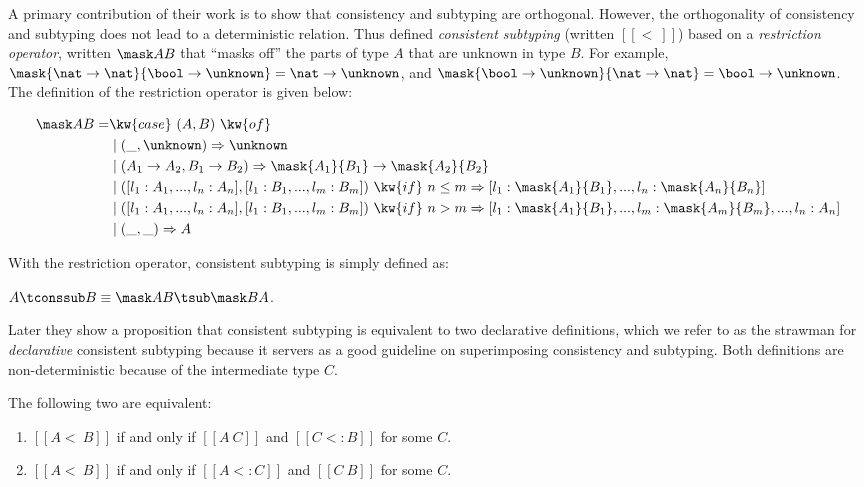 A primary contribution of their work is to show that consistency and subtyping
are orthogonal. However, the orthogonality of consistency and subtyping does not
lead to a deterministic relation.
Thus \citeauthor{siek2007gradual} defined \emph{consistent subtyping} (written
$[[<~]]$) based on a \emph{restriction operator}, written $\mask A B$ that
``masks off'' the parts of type $A$ that are unknown in type $B$. For example,
$\mask {\nat \to \nat} {\bool \to \unknown} = \nat \to \unknown$, and $\mask
{\bool \to \unknown} {\nat \to \nat} = {\bool \to \unknown}$. The definition of
the restriction operator is given below:

\begin{small}
\begin{align*}
   \mask A B = & \kw{case}~(A, B)~\kw{of}  \\
               & \mid (\_, \unknown) \Rightarrow \unknown \\
               & \mid (A_1 \to A_2, B_1 \to B_2)  \Rightarrow  \mask {A_1} {B_1} \to \mask {A_2} {B_2} \\
               & \mid ([l_1: A_1,...,l_n:A_n], [l_1:B_1,...,l_m:B_m])~\kw{if}~n \leq m \Rightarrow
                [l_1 : \mask {A_1} {B_1}, ..., l_n : \mask {A_n} {B_n}]\\
               & \mid ([l_1: A_1,...,l_n:A_n], [l_1:B_1,...,l_m:B_m])~\kw{if}~n > m \Rightarrow  [l_1 : \mask {A_1} {B_1}, ..., l_m : \mask {A_m} {B_m},...,l_n:A_n ]\\
               & \mid (\_, \_) \Rightarrow A
\end{align*}
\end{small}

With the restriction operator, consistent subtyping is simply defined as:

\begin{definition} \label{def:algo-old-decl-conssub}
$A \tconssub B \equiv \mask A B \tsub \mask B A$.
\end{definition}

Later they show a proposition that consistent subtyping is equivalent to two
declarative definitions, which we refer to as the strawman for \emph{declarative}
consistent subtyping because it servers as a good guideline on superimposing
consistency and subtyping. Both definitions are non-deterministic because of
the intermediate type $C$.

\begin{definition} \label{def:old-decl-conssub}
The following two are equivalent:
\begin{enumerate}
\item $[[A <~ B]]$ if and only if $[[A ~ C]]$ and $[[C <: B]]$ for some $C$.
\item $[[A <~ B]]$ if and only if $[[A <: C]]$ and $[[C ~ B]]$ for some $C$.
\end{enumerate}
\end{definition}

